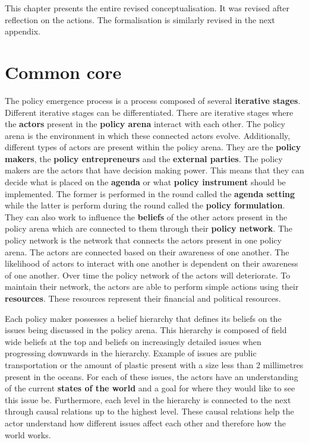 This chapter presents the entire revised conceptualisation. It was revised after reflection on the actions. The formalisation is similarly revised in the next appendix.

\section{Common core}
\label{sec:conceptualisationCommonCoreRevised}

The policy emergence process is a process composed of several {\bfseries iterative stages}. Different iterative stages can be differentiated. There are iterative stages where the {\bfseries actors} present in the {\bfseries policy arena} interact with each other. The policy arena is the environment in which these connected actors evolve. Additionally, different types of actors are present within the policy arena. They are the {\bfseries policy makers}, the {\bfseries policy entrepreneurs} and the {\bfseries external parties}. The policy makers are the actors that have decision making power. This means that they can decide what is placed on the {\bfseries agenda} or what {\bfseries policy instrument} should be implemented. The former is performed in the round called the {\bfseries agenda setting} while the latter is perform during the round called the {\bfseries policy formulation}. They can also work to influence the {\bfseries beliefs} of the other actors present in the policy arena which are connected to them through their {\bfseries policy network}. The policy network is the network that connects the actors present in one policy arena. The actors are connected based on their awareness of one another. The likelihood of actors to interact with one another is dependent on their awareness of one another. Over time the policy network of the actors will deteriorate. To maintain their network, the actors are able to perform simple actions using their {\bfseries resources}. These resources represent their financial and political resources.

Each policy maker possesses a belief hierarchy that defines its beliefs on the issues being discussed in the policy arena. This hierarchy is composed of field wide beliefs at the top and beliefs on increasingly detailed issues when progressing downwards in the hierarchy. Example of issues are public transportation or the amount of plastic present with a size less than 2 millimetres present in the oceans. For each of these issues, the actors have an understanding of the current {\bfseries states of the world} and a goal for where they would like to see this issue be. Furthermore, each level in the hierarchy is connected to the next through causal relations up to the highest level. These causal relations help the actor understand how different issues affect each other and therefore how the world works.

